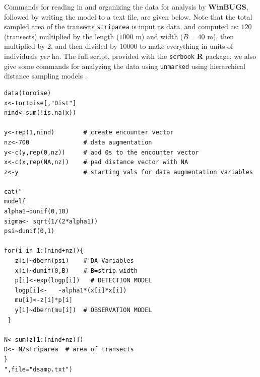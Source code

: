 Commands
for reading in and organizing the data for analysis by {\bf WinBUGS}, followed by
writing the model to a text file, are given below. Note that the total sampled area of
the transects \mbox{\tt striparea} is input as data, and computed as:
$120$ (transects)
multiplied by the length ($1000$ m) and width ($B=40$ m), then
multiplied by 2, and then divided by $10000$ to make everything in units
of individuals {\it per} ha. The full script, provided with the
\mbox{\tt scrbook} {\bf R} package, we also give some commands for
analyzing the data using \mbox{\tt unmarked}
\citep{fiske_chandler:2011} using hierarchical distance sampling
models \citep{royle_etal:2004}.
{\small
\begin{verbatim}
data(toroise)
x<-tortoise[,"Dist"]
nind<-sum(!is.na(x))

y<-rep(1,nind)        # create encounter vector
nz<-700               # data augmentation
y<-c(y,rep(0,nz))     # add 0s to the encounter vector
x<-c(x,rep(NA,nz))    # pad distance vector with NA
z<-y                  # starting vals for data augmentation variables

cat("
model{
alpha1~dunif(0,10)
sigma<- sqrt(1/(2*alpha1))
psi~dunif(0,1)

for(i in 1:(nind+nz)){
   z[i]~dbern(psi)    # DA Variables
   x[i]~dunif(0,B)    # B=strip width
   p[i]<-exp(logp[i])   # DETECTION MODEL
   logp[i]<-   -alpha1*(x[i]*x[i])
   mu[i]<-z[i]*p[i]
   y[i]~dbern(mu[i])  # OBSERVATION MODEL
 }

N<-sum(z[1:(nind+nz)])
D<- N/striparea  # area of transects
}
",file="dsamp.txt")
\end{verbatim}
}

